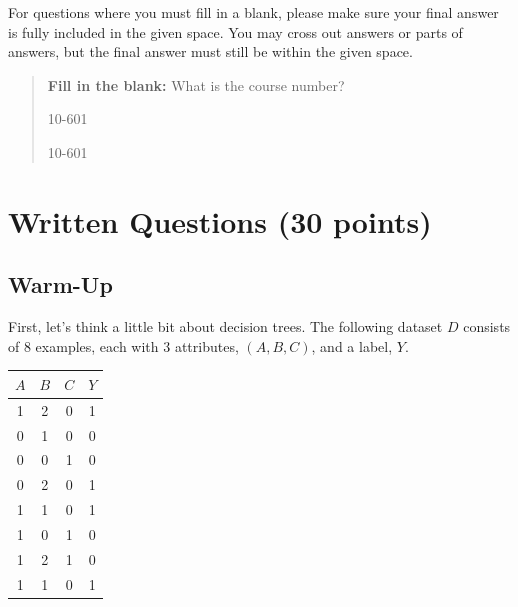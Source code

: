 \documentclass[11pt,addpoints,answers]{exam}
\begin{document}
For questions where you must fill in a blank, please make sure your final answer is fully included in the given space. You may cross out answers or parts of answers, but the final answer must still be within the given space.

\begin{quote}
\textbf{Fill in the blank:} What is the course number?

\begin{tcolorbox}[fit,height=1cm, width=4cm, blank, borderline={1pt}{-2pt},nobeforeafter]
    \begin{center}\huge10-601\end{center}
    \end{tcolorbox}\hspace{2cm}
    \begin{tcolorbox}[fit,height=1cm, width=4cm, blank, borderline={1pt}{-2pt},nobeforeafter]
    \begin{center}\huge10-601\end{center}
    \end{tcolorbox}
\end{quote}

\clearpage
\clearpage

\section{Written Questions (30 points)}
\subsection{Warm-Up}

First, let's think a little bit about decision trees. The following dataset $D$ consists of 8 examples, each with 3 attributes, $(A,B,C)$, and a label, $Y$.

\begin{center}
\begin{tabular}{|c|c|c|c|}
\hline
$A$ & $B$ & $C$ & $Y$ \\ \hline
1 & 2 & 0 & 1     \\ \hline
0 & 1 & 0 & 0     \\ \hline
0 & 0 & 1 & 0     \\ \hline
0 & 2 & 0 & 1     \\ \hline
1 & 1 & 0 & 1     \\ \hline
1 & 0 & 1 & 0     \\ \hline
1 & 2 & 1 & 0     \\ \hline
1 & 1 & 0 & 1     \\ \hline
\end{tabular}
\end{center}
\end{document}
